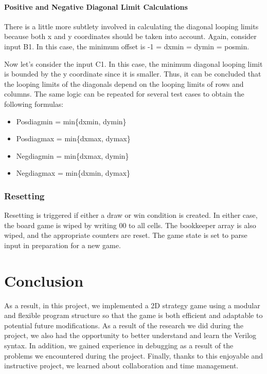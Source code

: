 \documentclass[conference]{IEEEtran}
\begin{document}
\paragraph{Positive and Negative Diagonal Limit Calculations}
There is a little more subtlety involved in calculating the diagonal looping limits because both x and y coordinates should be taken into account. Again, consider input B1. In this case, the minimum offset is -1 = dxmin = dymin = posmin. \\ 
\par Now let’s consider the input C1. In this case, the minimum diagonal looping limit is bounded by the y coordinate since it is smaller. Thus, it can be concluded that the looping limits of the diagonals depend on the looping limits of rows and columns. The same logic can be repeated for several test cases to obtain the following formulas:
\begin{itemize}
\item Posdiagmin = min\{dxmin, dymin\}
\item Posdiagmax = min\{dxmax, dymax\}
\item Negdiagmin = min\{dxmax, dymin\}
\item Negdiagmax = min\{dxmin, dymax\}
\end{itemize} \hfill \hfill
\subsubsection{Resetting}
Resetting is triggered if either a draw or win condition is created. In either case, the board game is wiped by writing 00 to all cells. The bookkeeper array is also wiped, and the appropriate counters are reset. The game state is set to parse input in preparation for a new game.
\section{Conclusion}
As a result, in this project, we implemented a 2D strategy game using a modular and flexible program structure so that the game is both efficient and adaptable to potential future modifications. As a result of the research we did during the project, we also had the opportunity to better understand and learn the Verilog syntax. In addition, we gained experience in debugging as a result of the problems we encountered during the project. Finally, thanks to this enjoyable and instructive project, we learned about collaboration and time management.


\end{document}
